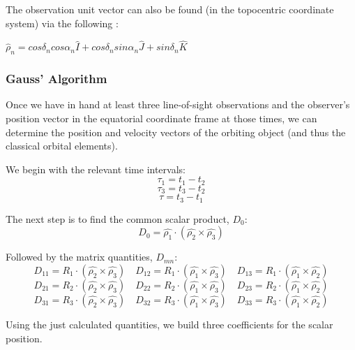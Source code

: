 \documentclass[11pt,twoside,letterpaper]{article}
\begin{document}
  The observation unit vector can also be found (in the topocentric
  coordinate system) via the following  \cite{Wikipedia_2018}:

  $\hat{\rho}_n = cos\delta_ncos\alpha_n\hat{I} + cos\delta_nsin\alpha_n\hat{J} + sin\delta_n\hat{K}$

  \subsubsection{Gauss' Algorithm}
  Once we have in hand at least three line-of-sight observations and
  the observer's position vector in the equatorial coordinate frame at
  those times, we can determine the position and velocity vectors of
  the orbiting object (and thus the classical orbital elements).

  We begin with the relevant time intervals:
  \begin{equation}
    \tau_1 = t_1 - t_2
  \end{equation}
  \begin{equation}
    \tau_3 = t_3 - t_2
  \end{equation}
  \begin{equation}
    \tau = t_3 - t_1
  \end{equation}

  The next step is to find the common scalar product, $D_0$:
  \begin{equation}
    D_0 = \hat{\rho_1}\cdot(\hat{\rho_2}\times\hat{\rho_3})
  \end{equation}

  Followed by the matrix quantities, $D_{mn}$:
  \begin{equation}
    D_{11} = R_1\cdot(\hat{\rho_2}\times\hat{\rho_3})
    \quad D_{12} = R_1\cdot(\hat{\rho_1}\times\hat{\rho_3})
    \quad D_{13} = R_1\cdot(\hat{\rho_1}\times\hat{\rho_2})
  \end{equation}
  \begin{equation}
    D_{21} = R_2\cdot(\hat{\rho_2}\times\hat{\rho_3})
    \quad D_{22} = R_2\cdot(\hat{\rho_1}\times\hat{\rho_3})
    \quad D_{23} = R_2\cdot(\hat{\rho_1}\times\hat{\rho_2})
  \end{equation}
  \begin{equation}
    D_{31} = R_3\cdot(\hat{\rho_2}\times\hat{\rho_3})
    \quad D_{32} = R_3\cdot(\hat{\rho_1}\times\hat{\rho_3})
    \quad D_{33} = R_3\cdot(\hat{\rho_1}\times\hat{\rho_2})
  \end{equation}

  Using the just calculated quantities, we build three coefficients
  for the scalar position.
\end{document}
